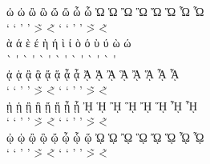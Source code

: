 \documentclass[a4paper]{article}
\begin{document}
{  ὠ   ὡ   ὢ   ὣ   ὤ   ὥ   ὦ    ὧ    Ὠ   Ὡ   Ὢ   Ὣ   Ὤ   Ὥ   Ὦ  Ὧ \\
  \>\textomega{}
  \<\textomega{}
  \>`\textomega{}
  \<`\textomega{}
  \>'\textomega{}
  \<'\textomega{}
  \~>\textomega{}
  \~<\textomega{}
  \>\textOmega{}
  \<\textOmega{}
  \>`\textOmega{}
  \<`\textOmega{}
  \>'\textOmega{}
  \<'\textOmega{}
  \~>\textOmega{}
  \~<\textOmega{} \\

  ὰ   ά   ὲ   έ   ὴ   ή   ὶ    ί    ὸ   ό   ὺ   ύ   ὼ   ώ        \\
  \`\textalpha{}
  \'\textalpha{}
  \`\textepsilon{}
  \'\textepsilon{}
  \`\texteta{}
  \'\texteta{}
  \`\textiota{}
  \'\textiota{}
  \`\textomicron{}
  \'\textomicron{}
  \`\textupsilon{}
  \'\textupsilon{}
  \`\textomega{}
  \'\textomega{} \\

  ᾀ   ᾁ   ᾂ   ᾃ   ᾄ   ᾅ   ᾆ    ᾇ    ᾈ   ᾉ   ᾊ   ᾋ   ᾌ   ᾍ   ᾎ  ᾏ \\
  \>\textalpha\ypogegrammeni{}
  \<\textalpha\ypogegrammeni{}
  \>`\textalpha\ypogegrammeni{}
  \<`\textalpha\ypogegrammeni{}
  \>'\textalpha\ypogegrammeni{}
  \<'\textalpha\ypogegrammeni{}
  \~>\textalpha\ypogegrammeni{}
  \~<\textalpha\ypogegrammeni{}
  \>\textAlpha\ypogegrammeni{}
  \<\textAlpha\ypogegrammeni{}
  \>`\textAlpha\ypogegrammeni{}
  \<`\textAlpha\ypogegrammeni{}
  \>'\textAlpha\ypogegrammeni{}
  \<'\textAlpha\ypogegrammeni{}
  \~>\textAlpha\ypogegrammeni{}
  \~<\textAlpha\ypogegrammeni{} \\

  ᾐ   ᾑ   ᾒ   ᾓ   ᾔ   ᾕ   ᾖ    ᾗ    ᾘ   ᾙ   ᾚ   ᾛ   ᾜ   ᾝ   ᾞ  ᾟ \\
  \>\texteta\ypogegrammeni{}
  \<\texteta\ypogegrammeni{}
  \>`\texteta\ypogegrammeni{}
  \<`\texteta\ypogegrammeni{}
  \>'\texteta\ypogegrammeni{}
  \<'\texteta\ypogegrammeni{}
  \~>\texteta\ypogegrammeni{}
  \~<\texteta\ypogegrammeni{}
  \>\textEta\ypogegrammeni{}
  \<\textEta\ypogegrammeni{}
  \>`\textEta\ypogegrammeni{}
  \<`\textEta\ypogegrammeni{}
  \>'\textEta\ypogegrammeni{}
  \<'\textEta\ypogegrammeni{}
  \~>\textEta\ypogegrammeni{}
  \~<\textEta\ypogegrammeni{} \\

  ᾠ   ᾡ   ᾢ   ᾣ   ᾤ   ᾦ   ᾧ    ᾥ    ᾨ   ᾩ   ᾪ   ᾫ   ᾬ   ᾭ   ᾮ  ᾯ \\
  \>\textomega\ypogegrammeni{}
  \<\textomega\ypogegrammeni{}
  \>`\textomega\ypogegrammeni{}
  \<`\textomega\ypogegrammeni{}
  \>'\textomega\ypogegrammeni{}
  \<'\textomega\ypogegrammeni{}
  \~>\textomega\ypogegrammeni{}
  \~<\textomega\ypogegrammeni{}
  \>\textOmega\ypogegrammeni{}
  \<\textOmega\ypogegrammeni{}
  \>`\textOmega\ypogegrammeni{}
  \<`\textOmega\ypogegrammeni{}
  \>'\textOmega\ypogegrammeni{}
  \<'\textOmega\ypogegrammeni{}
  \~>\textOmega\ypogegrammeni{}
  \~<\textOmega\ypogegrammeni{} \\

}
\end{document}
